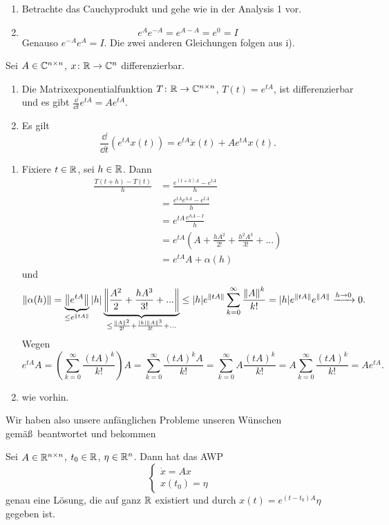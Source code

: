 \begin{beweis}
	\begin{enumerate}
		\item Betrachte das Cauchyprodukt und gehe wie in der Analysis 1 vor.
		\item \[ e^Ae^{-A}=e^{A-A}=e^0=I \]
		Genauso $ e^{-A}e^A=I $. Die zwei anderen Gleichungen folgen aus i).
	\end{enumerate}
\end{beweis}
\begin{satz}
	Sei $ A\in\mathbb{C}^{n\times n} $, $ x\colon\mathbb{R}\rightarrow\mathbb{C}^n $ differenzierbar.
	\begin{enumerate}
		\item Die Matrixexponentialfunktion $ T\colon\mathbb{R}\rightarrow\mathbb{C}^{n\times n} $, $ T(t)=e^{tA} $, ist differenzierbar und es gibt $ \frac{\dd}{\dd t}e^{tA}=Ae^{tA} $.
		\item Es gilt \[ \frac{\dd}{\dd t}(e^{tA}x(t))=e^{tA}\dot x(t)+Ae^{tA}x(t). \]
	\end{enumerate}
\end{satz}
\begin{beweis}
	\begin{enumerate}
		\item Fixiere $ t\in\mathbb{R} $, sei $ h\in\mathbb{R} $. Dann
		\begin{align*} \frac{T(t+h)-T(t)}{h}&=\frac{e^{(t+h)A}-e^{tA}}{h}\\&=\frac{e^{tA}e^{hA}-e^{tA}}{h}\\&=e^{tA}\frac{e^{hA-I}}{h}\\&=e^{tA}\left(A+\frac{hA^2}{2!}+\frac{h^2A^3}{3!}+...\right)\\&=e^{tA}A+\alpha(h) \end{align*}
		und
		\[ \left\|\alpha(h)\right\|=\underbrace{\left\|e^{tA}\right\|}_{\leq e^{\left\|tA\right\|}}|h|\underbrace{\left\|\frac{A^2}{2}+\frac{hA^3}{3!}+...\right\|}_{\leq\frac{\left\|A\right\|^2}{2!}+\frac{|h|\left\|A\right\|^3}{3!}+...}\leq |h|e^{\left\|tA\right\|}\sum_{k=0}^{\infty}\frac{\left\|A\right\|^k}{k!}=|h|e^{\left\|tA\right\|}e^{\left\|A\right\|}\xrightarrow{h\to 0}0. \]
		Wegen
		\[ e^{tA}A=\left(\sum_{k=0}^{\infty}\frac{(tA)^k}{k!}\right)A=\sum_{k=0}^{\infty}\frac{(tA)^kA}{k!}=\sum_{k=0}^{\infty}A\frac{(tA)^k}{k!}=A\sum_{k=0}^{\infty}\frac{(tA)^k}{k!}=Ae^{tA}. \]
		\item wie vorhin.
	\end{enumerate}
\end{beweis}
Wir haben also unsere anf\"anglichen Probleme unseren W\"unschen gem\"a\ss\ beantwortet und bekommen
\begin{satz}
	Sei $ A\in\mathbb{R}^{n\times n} $, $ t_0\in\mathbb{R} $, $ \eta\in\mathbb{R}^n $. Dann hat das AWP
	\[ \begin{cases}
	\dot x=Ax\\x(t_0)=\eta
	\end{cases} \]
	genau eine L\"osung, die auf ganz $ \mathbb{R} $ existiert und durch $ x(t)=e^{(t-t_0)A}\eta $ gegeben ist.
\end{satz}
